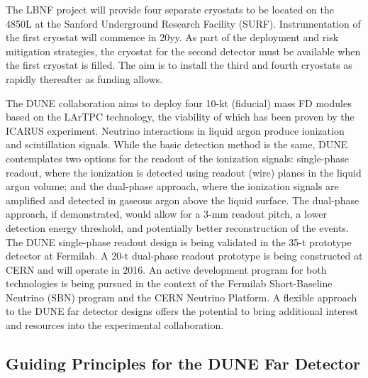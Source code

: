The LBNF project will provide four separate cryostats to be located on the 4850L at the 
Sanford Underground Research Facility (SURF).  Instrumentation of the first cryostat 
will commence in 20yy. %
As part of the deployment and risk mitigation strategies, 
the cryostat for the second detector must be available when the first cryostat 
is filled. The aim is to install the third and fourth cryostats as rapidly thereafter as funding 
allows.

The DUNE collaboration aims to deploy four 10-kt (fiducial) mass FD modules based 
on the %
LArTPC technology, the viability 
of %
which has been proven by the ICARUS experiment. Neutrino 
interactions in liquid argon produce ionization and scintillation signals. While 
the basic detection method is the same, DUNE contemplates two options for the readout 
of the ionization signals: single-phase readout, where the ionization is detected 
using readout (wire) planes in the liquid argon volume; and the dual-phase approach, where 
the ionization signals are amplified and detected in gaseous argon above the liquid 
surface. The dual-phase approach, if demonstrated, would allow for a 3-mm readout 
pitch, a lower detection energy threshold, and potentially better reconstruction of 
the events. The DUNE single-phase readout design is being validated 
in the 35-t prototype detector at Fermilab. A 20-t dual-phase readout prototype is being 
constructed at CERN and will operate in 2016. An active development program for 
both technologies is being pursued in the context of the Fermilab Short-Baseline Neutrino (SBN)
program and 
the CERN Neutrino Platform. 
A flexible 
approach to the DUNE far detector designs offers the potential to bring additional 
interest and resources into the experimental collaboration. 

\subsection{Guiding Principles for the DUNE Far Detector}

